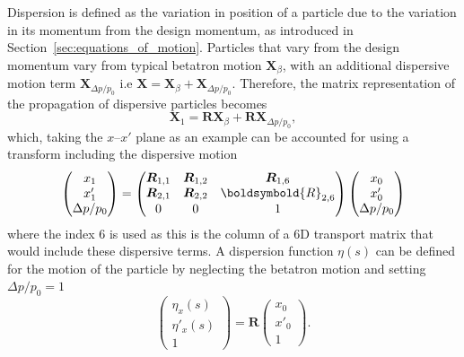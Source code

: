 \documentclass[../main.tex]{subfiles}
\begin{document}
Dispersion is defined as the variation in position of a particle due to the variation in its momentum from the design momentum, as introduced in Section~\ref{sec:equations_of_motion}. Particles that vary from the design momentum vary from typical betatron motion $\boldsymbol{X}_{\beta}$, with an additional dispersive motion term $\boldsymbol{X}_{\Delta p/p_{0}}$ i.e $\boldsymbol{X} = \boldsymbol{X}_{\beta} + \boldsymbol{X}_{\Delta p/p_{0}}$. Therefore, the matrix representation of the propagation of dispersive particles becomes
\begin{equation}
\boldsymbol{X}_{1} = \boldsymbol{R}\boldsymbol{X}_{\beta} + \boldsymbol{R}\boldsymbol{X}_{\Delta p/p_{0}},
\label{eq:dispersive_transport_matrix_propagation}    
\end{equation}
which, taking the $x$--$x'$ plane as an example can be accounted for using a transform including the dispersive motion
\begin{equation}
\begin{pmatrix}
x_{1} \\
x'_{1} \\
\Delta p /p_{0}
\end{pmatrix}
=
\begin{pmatrix}
\boldsymbol{R}_{1,1} & \boldsymbol{R}_{1,2} & \boldsymbol{R}_{1,6} \\
\boldsymbol{R}_{2,1} & \boldsymbol{R}_{2,2} & \boldsymbold{R}_{2,6} \\
0 & 0 & 1
\end{pmatrix}
\begin{pmatrix}
x_{0} \\
x'_{0} \\
\Delta p / p_{0} 
\end{pmatrix}
\label{eq:dispersive_transport_simplified}
\end{equation}
where the index 6 is used as this is the column of a 6D transport matrix that would include these dispersive terms. A dispersion function $\eta\left(s\right)$ can be defined for the motion of the particle by neglecting the betatron motion and setting $\Delta p/p_{0} =1$
\begin{equation}
\begin{pmatrix}
\eta_{x}\left(s\right) \\
\eta'_{x}\left(s\right) \\
1
\end{pmatrix}
=\boldsymbol{R}
\begin{pmatrix}
x_{0} \\
x'_{0} \\
1
\end{pmatrix}.
\label{eq:dispersion_function}    
\end{equation}
\end{document}
